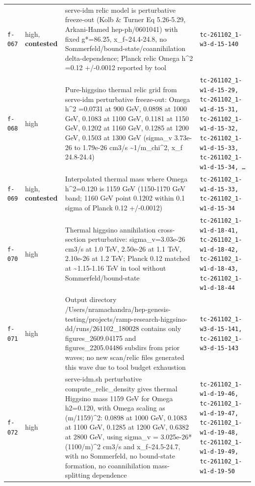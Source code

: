 \documentclass[11pt,a4paper]{article}
\begin{document}
\begin{longtable}{@{}p{}p{}p{}p{}@{}}
\texttt{f-067} & high, \textbf{contested} & serve-idm relic model is perturbative freeze-out (Kolb \& Turner Eq 5.26-5.29, Arkani-Hamed hep-ph/0601041) with fixed g*=86.25, x\_f\textasciitilde{}24.4-24.8, no Sommerfeld/bound-state/coannihilation delta-dependence; Planck relic Omega h\textasciicircum{}2 =0.12 +/-0.0012 reported by tool & \texttt{tc-261102\_\allowbreak{}1-w3-d-15-140} \\
\texttt{f-068} & high & Pure-higgsino thermal relic grid from serve-idm perturbative freeze-out: Omega h\textasciicircum{}2 =0.0731 at 900 GeV, 0.0898 at 1000 GeV, 0.1083 at 1100 GeV, 0.1181 at 1150 GeV, 0.1202 at 1160 GeV, 0.1285 at 1200 GeV, 0.1503 at 1300 GeV (sigma\_v 3.73e-26 to 1.79e-26 cm3/s \textasciitilde{}1/m\_chi\textasciicircum{}2, x\_f 24.8-24.4) & \texttt{tc-261102\_\allowbreak{}1-w1-d-15-29,\allowbreak{} tc-261102\_\allowbreak{}1-w1-d-15-31,\allowbreak{} tc-261102\_\allowbreak{}1-w1-d-15-32,\allowbreak{} tc-261102\_\allowbreak{}1-w1-d-15-33,\allowbreak{} tc-261102\_\allowbreak{}1-w1-d-15-34,\allowbreak{} \ldots{}\allowbreak{}} \\
\texttt{f-069} & high, \textbf{contested} & Interpolated thermal mass where Omega h\textasciicircum{}2=0.120 is 1159 GeV (1150-1170 GeV band; 1160 GeV point 0.1202 within 0.1 sigma of Planck 0.12 +/-0.0012) & \texttt{tc-261102\_\allowbreak{}1-w1-d-15-33,\allowbreak{} tc-261102\_\allowbreak{}1-w1-d-15-34} \\
\texttt{f-070} & high & Thermal higgsino annihilation cross-section perturbative: sigma\_v=3.03e-26 cm3/s at 1.0 TeV, 2.50e-26 at 1.1 TeV, 2.10e-26 at 1.2 TeV; Planck 0.12 matched at \textasciitilde{}1.15-1.16 TeV in tool without Sommerfeld/bound-state & \texttt{tc-261102\_\allowbreak{}1-w1-d-18-41,\allowbreak{} tc-261102\_\allowbreak{}1-w1-d-18-42,\allowbreak{} tc-261102\_\allowbreak{}1-w1-d-18-43,\allowbreak{} tc-261102\_\allowbreak{}1-w1-d-18-44} \\
\texttt{f-071} & high & Output directory /Users/nramachandra/hep-genesis-testing/projects/ramp-research-higgsino-dd/runs/261102\_180028 contains only figures\_2609.04175 and figures\_2205.04486 subdirs from prior waves; no new scan/relic files generated this wave due to tool budget exhaustion & \texttt{tc-261102\_\allowbreak{}1-w3-d-15-141,\allowbreak{} tc-261102\_\allowbreak{}1-w3-d-15-143} \\
\texttt{f-072} & high & serve-idm.sh perturbative compute\_relic\_density gives thermal Higgsino mass 1159 GeV for Omega h2=0.120, with Omega scaling as (m/1159)\textasciicircum{}2: 0.0898 at 1000 GeV, 0.1083 at 1100 GeV, 0.1285 at 1200 GeV, 0.6382 at 2800 GeV, using sigma\_v = 3.025e-26*(1100/m)\textasciicircum{}2 cm3/s and x\_f\textasciitilde{}24.5-24.7, with no Sommerfeld, no bound-state formation, no coannihilation mass-splitting dependence & \texttt{tc-261102\_\allowbreak{}1-w1-d-19-46,\allowbreak{} tc-261102\_\allowbreak{}1-w1-d-19-47,\allowbreak{} tc-261102\_\allowbreak{}1-w1-d-19-48,\allowbreak{} tc-261102\_\allowbreak{}1-w1-d-19-49,\allowbreak{} tc-261102\_\allowbreak{}1-w1-d-19-50} \\

\end{longtable}
\end{document}
